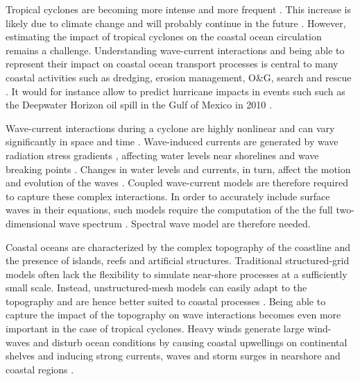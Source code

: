 \documentclass[preprint,12pt,authoryear]{elsarticle}
\begin{document}

Tropical cyclones are becoming more intense and more frequent \citep{bhatia2019recent, kossin2020global}. This increase is likely due to climate change and will probably continue in the future \citep{knutson2020tropical}. However, estimating the impact of tropical cyclones on the coastal ocean circulation remains a challenge. Understanding wave-current interactions and being able to represent their impact on coastal ocean transport processes is central to many coastal activities such as dredging, erosion management, O\&G, search and rescue \citep{bever2013simulating,li1998three, breivik2013advances}. It would for instance allow to predict hurricane impacts in events such such as the Deepwater Horizon oil spill in the Gulf of Mexico in 2010 \citep{le2012surface}.

Wave-current interactions during a cyclone are highly nonlinear and can vary significantly in space and time \citep{wu2011fvcom}. Wave-induced currents are generated by wave radiation stress gradients \citep{longuet1970longshore}, affecting water levels near shorelines and wave breaking points \citep{longuet1964radiation}. Changes in water levels and currents, in turn, affect the motion and evolution of the waves \citep{sikiric2013coupling}. Coupled wave-current models are therefore required to capture these complex interactions. In order to accurately include surface waves in their equations, such models require the computation of the the full two-dimensional wave spectrum \citep{van2018stokes}. Spectral wave model are therefore needed.

Coastal oceans are characterized by the complex topography of the coastline and the presence of islands, reefs and artificial structures. Traditional structured-grid models often lack the flexibility to simulate near-shore processes at a sufficiently small scale. Instead, unstructured-mesh models can easily adapt to the topography and are hence better suited to coastal processes \citep{wu2011fvcom, chen2007finite}. Being able to capture the impact of the topography on wave interactions becomes even more important in the case of tropical cyclones. Heavy winds generate large wind-waves and disturb ocean conditions \citep{liu2020impacts} by causing coastal upwellings on continental shelves \citep{smith1982response} and inducing strong currents, waves and storm surges in nearshore and coastal regions \citep{dietrich2010high, weisberg2006hurricane}. 
\end{document}
